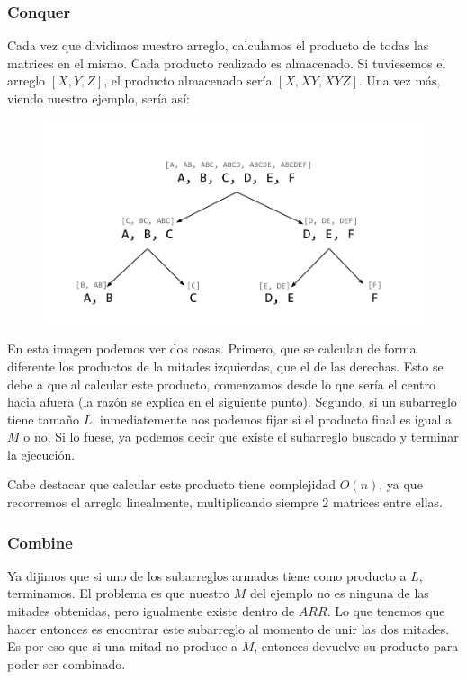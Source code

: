 \subsubsection{Conquer}
Cada vez que dividimos nuestro arreglo, calculamos el producto de todas las matrices en el mismo. Cada producto realizado es almacenado. Si tuviesemos el arreglo $[X, Y, Z]$, el producto almacenado sería $[X, XY, XYZ]$. Una vez más, viendo nuestro ejemplo, sería así:
\begin{figure}[H]
\centering
\includegraphics[scale=0.35]{Imagenes/ej4-ejem2}
\end{figure}

En esta imagen podemos ver dos cosas. Primero, que se calculan de forma diferente los productos de la mitades izquierdas, que el de las derechas. Esto se debe a que al calcular este producto, comenzamos desde lo que sería el centro hacia afuera (la razón se explica en el siguiente punto). Segundo, si un subarreglo tiene tamaño $L$, inmediatemente nos podemos fijar si el producto final es igual a $M$ o no. Si lo fuese, ya podemos decir que existe el subarreglo buscado y terminar la ejecución. 

Cabe destacar que calcular este producto tiene complejidad $O(n)$, ya que recorremos el arreglo linealmente, multiplicando siempre 2 matrices entre ellas.

\subsubsection{Combine}
Ya dijimos que si uno de los subarreglos armados tiene como producto a $L$, terminamos. El problema es que nuestro $M$ del ejemplo no es ninguna de las mitades obtenidas, pero igualmente existe dentro de $ARR$. Lo que tenemos que hacer entonces es encontrar este subarreglo al momento de unir las dos mitades. Es por eso que si una mitad no produce a $M$, entonces devuelve su producto para poder ser combinado.

